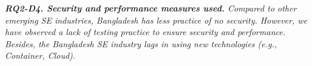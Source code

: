 \begin{tcolorbox}[flushleft upper,boxrule=1pt,arc=0pt,left=0pt,right=0pt,top=0pt,bottom=0pt,colback=white,after=\ignorespacesafterend\par\noindent]
\nd\it{\bf{RQ2-D4. Security and performance measures used.}}
Compared to other emerging SE industries, Bangladesh has less practice of no
security. However, we have observed a lack of testing practice to ensure security
and performance. Besides, the Bangladesh SE industry lags in using new
technologies (e.g., Container, Cloud).
\end{tcolorbox}